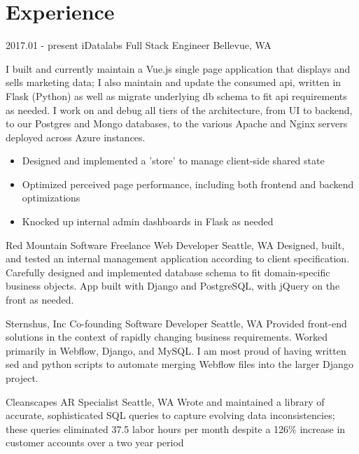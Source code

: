 \documentclass[10pt,a4paper,sans]{moderncv}        %
\begin{document}
\section{Experience}

\begin{comment}
  \cventry
  {date - date}
  {Employer}
  {Job Title}
  {}
  {City, State}
  {Description of work
    \begin{itemize}
    \item specific achievement
    \item specific achievement
    \end{itemize}}
\end{comment}

\cventry
{2017.01 - present}
{iDatalabs}
{Full Stack Engineer}
{}
{Bellevue, WA}
{I built and currently maintain a Vue.js single page application that displays and sells
  marketing data; I also maintain and update the consumed api, written in Flask
  (Python) as well as migrate underlying db schema to fit api requirements as
  needed. I work on and debug all tiers of the architecture, from UI to backend,
  to our Postgres and Mongo databases, to the various Apache and Nginx servers
  deployed across Azure instances.
  \begin{itemize}
  \item Designed and implemented a 'store' to manage client-side shared state
  \item Optimized perceived page performance, including both frontend and
    backend optimizations
  \item Knocked up internal admin dashboards in Flask as needed
  \end{itemize}}

 {Red Mountain Software} {Freelance Web Developer}
{} {Seattle, WA}
{Designed, built, and tested an internal management application
  according to client specification. Carefully designed and implemented database
  schema to fit domain-specific business objects. App built with Django and PostgreSQL, with
  jQuery on the front as needed.}

 {Sternshus, Inc} {Co-founding Software Developer}
{}
{Seattle, WA}
{Provided front-end solutions in the context of rapidly
  changing business requirements. Worked primarily in Webflow, Django, and
  MySQL. I am most proud of having written sed and python scripts to automate
  merging Webflow files into the larger Django project.
}

 {Cleanscapes} {AR Specialist} {} {Seattle, WA}
{Wrote and maintained a library of accurate, sophisticated SQL queries to
  capture evolving data inconsistencies; these queries eliminated 37.5 labor
  hours per month despite a 126\% increase in customer accounts over a two year
  period
}
\end{document}
